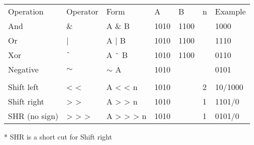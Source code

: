 \documentclass[en, 11pt, xcolor=dvipsnames]{beamer}
\begin{document}
\begin{frame}[fragile]


	\begin{columns}[c]
		\begin{column}{0.98\textwidth}

			\begin{table}
				\begin{tabular}{l l l l l l l}
					Operation     & Operator   & Form           & A    & B    & n & Example \\
					And           & \&         & A \& B         & 1010 & 1100 &   & 1000    \\
					Or            & |          & A | B          & 1010 & 1100 &   & 1110    \\
					Xor           & $\string^$ & A $\string^$ B & 1010 & 1100 &   & 0110    \\
					Negative      & $\sim$     & $\sim$ A       & 1010 &      &   & 0101    \\
					              &            &                &                           \\
					Shift left    & < <        & A < < n        & 1010 &      & 2 & 10/1000 \\
					Shift right   & > >        & A > > n        & 1010 &      & 1 & 1101/0  \\
					SHR (no sign) & > > >      & A > > > n      & 1010 &      & 1 & 0101/0  \\
				\end{tabular}
			\end{table}
			* SHR is a short cut for Shift right

		\end{column}
	\end{columns}

\end{frame}


\end{document}
